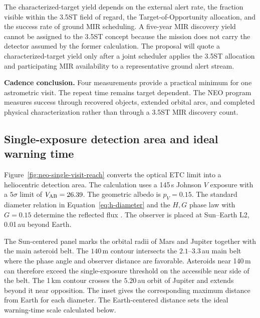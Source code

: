 The characterized-target yield depends on the external alert rate, the
fraction visible within the 3.5ST field of regard, the Target-of-Opportunity
allocation, and the success rate of ground MIR scheduling. A five-year MIR
discovery yield cannot be assigned to the 3.5ST concept because the mission
does not carry the detector assumed by the former calculation. The proposal
will quote a characterized-target yield only after a joint scheduler applies
the 3.5ST allocation and participating MIR availability to a representative
ground alert stream.

\begin{resultbox}
\textbf{\color{cGold}Cadence conclusion.}
Four measurements provide a practical minimum for one astrometric visit.
The repeat time remains target dependent. The NEO program measures success
through recovered objects, extended orbital arcs, and completed physical
characterization rather than through a 3.5ST MIR discovery count.
\end{resultbox}


\subsection{Single-exposure detection area and ideal warning time}

Figure~\ref{fig:neo-single-visit-reach} converts the optical ETC limit into
a heliocentric detection area. The calculation uses a 145\,s Johnson $V$
exposure with a $5\sigma$ limit of $V_{\rm AB}=26.39$. The geometric albedo
is $p_V=0.15$. The standard diameter relation in
Equation~\ref{eq:h-diameter} and the $H,G$ phase law with $G=0.15$ determine
the reflected flux \cite{Bowell1989}. The observer is placed at Sun--Earth
L2, 0.01\,au beyond Earth.

The Sun-centered panel marks the orbital radii of Mars and Jupiter together
with the main asteroid belt. The $140$\,m contour intersects the
$2.1$--$3.3$\,au main belt where the phase angle and observer distance are
favorable. Asteroids near 140\,m can therefore exceed the single-exposure
threshold on the accessible near side of the belt. The 1\,km contour crosses
the $5.20$\,au orbit of Jupiter and extends beyond it
near opposition. The inset gives the corresponding maximum distance from
Earth for each diameter. The Earth-centered distance sets the ideal
warning-time scale calculated below.


